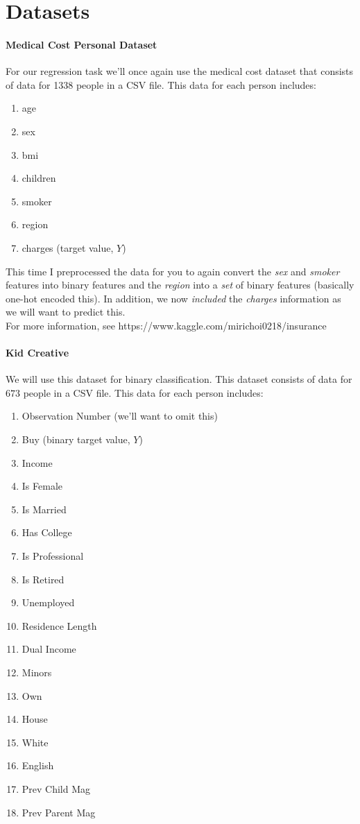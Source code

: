 \documentclass[12pt]{article}
\begin{document}
\newpage
\section*{Datasets}
\paragraph{Medical Cost Personal Dataset}
For our regression task we'll once again use the medical cost dataset that consists of data for 1338 people in a CSV file.  This data for each person includes:
\begin{enumerate}
\item age
\item sex
\item bmi
\item children
\item smoker
\item region
\item charges (target value, $Y$)
\end{enumerate}

\noindent
This time I preprocessed the data for you to again convert the \emph{sex} and \emph{smoker} features into binary features and the \emph{region} into a \emph{set} of binary features (basically one-hot encoded this).  In addition, we now \emph{included} the \emph{charges} information as we will want to predict this.\\

\noindent
For more information, see https://www.kaggle.com/mirichoi0218/insurance

\paragraph{Kid Creative}
We will use this dataset for binary classification.  This dataset consists of data for $673$ people in a CSV file.  This data for each person includes:
\begin{enumerate}
\item Observation Number (we'll want to omit this)
\item Buy (binary target value, $Y$)
\item Income
\item Is Female
\item Is Married
\item Has College
\item Is Professional
\item Is Retired
\item Unemployed
\item Residence Length
\item Dual Income
\item Minors
\item Own
\item House
\item White
\item English
\item Prev Child Mag
\item Prev Parent Mag
\end{enumerate}
\end{document}
